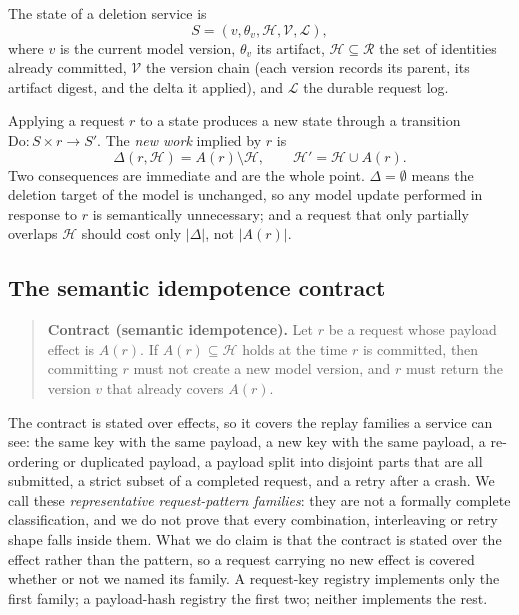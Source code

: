 \documentclass[conference]{IEEEtran}
\newcommand{\Hset}{\mathcal{H}}
\newcommand{\Rset}{\mathcal{R}}
\begin{document}
The state of a deletion service is
\begin{equation}
S=(v,\theta_v,\Hset,\mathcal{V},\mathcal{L}),
\end{equation}
where $v$ is the current model version, $\theta_v$ its artifact, $\Hset\subseteq
\Rset$ the set of identities already committed, $\mathcal{V}$ the version chain
(each version records its parent, its artifact digest, and the delta it applied), and
$\mathcal{L}$ the durable request log.

Applying a request $r$ to a state produces a new state through a transition
$\mathrm{Do}\colon S\times r\to S'$.  The \emph{new work} implied by $r$ is
\begin{equation}
\Delta(r,\Hset) = A(r)\setminus\Hset ,
\qquad
\Hset'=\Hset\cup A(r).
\label{eq:delta}
\end{equation}
Two consequences are immediate and are the whole point.  $\Delta=\emptyset$ means the
deletion target of the model is unchanged, so any model update performed in response to $r$
is semantically unnecessary; and a request that only partially overlaps $\Hset$ should cost
only $|\Delta|$, not $|A(r)|$.

\subsection{The semantic idempotence contract}
\label{sec:contract}

\begin{quote}
\textbf{Contract (semantic idempotence).} Let $r$ be a request whose payload effect
is $A(r)$.  If $A(r)\subseteq \Hset$ holds at the time $r$ is committed, then
committing $r$ must not create a new model version, and $r$ must return the version
$v$ that already covers $A(r)$.
\end{quote}

The contract is stated over effects, so it covers the replay families a service can see: the
same key with the same payload, a new key with the same payload, a re-ordering or duplicated
payload, a payload split into disjoint parts that are all submitted, a strict subset of a
completed request, and a retry after a crash.  We call these \emph{representative
request-pattern families}: they are not a formally complete classification, and we do not prove
that every combination, interleaving or retry shape falls inside them.  What we do claim is
that the contract is stated over the effect rather than the pattern, so a request carrying no
new effect is covered whether or not we named its family.  A request-key registry implements
only the first family; a payload-hash registry the first two; neither implements the rest.
\end{document}

